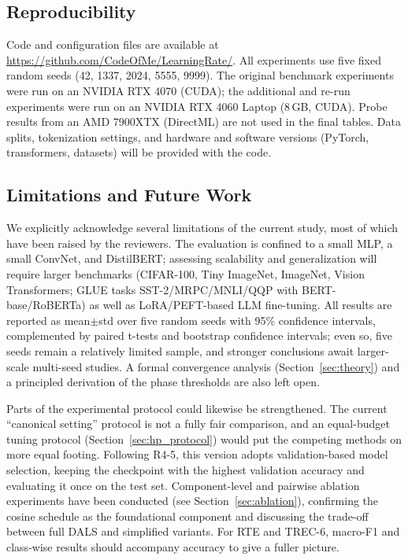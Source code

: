 \documentclass[a4paper,fleqn]{cas-dc}
\begin{document}
\subsection{Reproducibility}\label{sec:reproducibility}

Code and configuration files are available at \url{https://github.com/CodeOfMe/LearningRate/}. All experiments use five fixed random seeds (42, 1337, 2024, 5555, 9999). The original benchmark experiments were run on an NVIDIA RTX 4070 (CUDA); the additional and re-run experiments were run on an NVIDIA RTX 4060 Laptop (8\,GB, CUDA). Probe results from an AMD 7900XTX (DirectML) are not used in the final tables. Data splits, tokenization settings, and hardware and software versions (PyTorch, transformers, datasets) will be provided with the code.

\subsection{Limitations and Future Work}\label{sec:limitations}

We explicitly acknowledge several limitations of the current study, most of which have been raised by the reviewers. The evaluation is confined to a small MLP, a small ConvNet, and DistilBERT; assessing scalability and generalization will require larger benchmarks (CIFAR-100, Tiny ImageNet, ImageNet, Vision Transformers; GLUE tasks SST-2/MRPC/MNLI/QQP with BERT-base/RoBERTa) as well as LoRA/PEFT-based LLM fine-tuning. All results are reported as mean$\pm$std over five random seeds with 95\% confidence intervals, complemented by paired t-tests and bootstrap confidence intervals; even so, five seeds remain a relatively limited sample, and stronger conclusions await larger-scale multi-seed studies. A formal convergence analysis (Section~\ref{sec:theory}) and a principled derivation of the phase thresholds are also left open.

Parts of the experimental protocol could likewise be strengthened. The current ``canonical setting'' protocol is not a fully fair comparison, and an equal-budget tuning protocol (Section~\ref{sec:hp_protocol}) would put the competing methods on more equal footing. Following R4-5, this version adopts validation-based model selection, keeping the checkpoint with the highest validation accuracy and evaluating it once on the test set. Component-level and pairwise ablation experiments have been conducted (see Section~\mbox{\ref{sec:ablation}}), confirming the cosine schedule as the foundational component and discussing the trade-off between full DALS and simplified variants. For RTE and TREC-6, macro-F1 and class-wise results should accompany accuracy to give a fuller picture.
\end{document}
